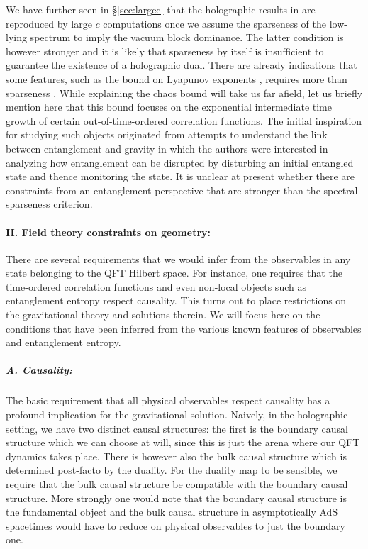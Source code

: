 \documentclass[12pt,openany]{book}
\begin{document}
We have further seen in \S\ref{sec:largec} that the holographic results in  are reproduced by large $c$ computations once we assume  the sparseness of the low-lying spectrum to imply the vacuum block dominance. The latter condition is however stronger and it is likely that sparseness by itself is insufficient to guarantee the existence of a holographic dual. There are already indications that some features, such as the bound on Lyapunov exponents \cite{Maldacena:2015waa}, requires more than sparseness \cite{Perlmutter:2016pkf}. While explaining the chaos bound will take us far afield, let us briefly mention here that this bound focuses on the exponential intermediate time growth of certain out-of-time-ordered correlation functions. The initial inspiration for studying such objects originated from attempts to understand the link between entanglement and gravity  \cite{Shenker:2013pqa} in which the authors were interested in analyzing how entanglement can be disrupted by disturbing an initial entangled state and thence monitoring the state.   It is unclear at present whether there are constraints from an entanglement perspective that are stronger than the spectral sparseness  criterion.



\paragraph{II. Field theory constraints on geometry:} There are several requirements that we would infer from the observables in any state belonging to the QFT Hilbert space. For instance, one requires that the time-ordered correlation functions and even non-local objects such as entanglement entropy respect causality. This turns out to place restrictions on the gravitational theory and solutions therein.  We will focus here on the conditions that have been inferred from the various known features of observables and entanglement entropy.

\subparagraph{A. Causality:} The basic requirement that all physical observables respect causality has a profound implication for the gravitational solution. Naively, in the holographic setting, we have two distinct causal structures: the first is the boundary causal structure which we can choose at will, since this is just the arena where our QFT dynamics takes place. There is however  also the bulk causal structure which is determined post-facto by the duality. For the duality map to be sensible, we require that the bulk causal structure be compatible with the boundary causal structure. More strongly one would note that the boundary causal structure is the fundamental object and the bulk causal structure in asymptotically AdS spacetimes would have to reduce on physical observables to just the boundary one.
\end{document}

